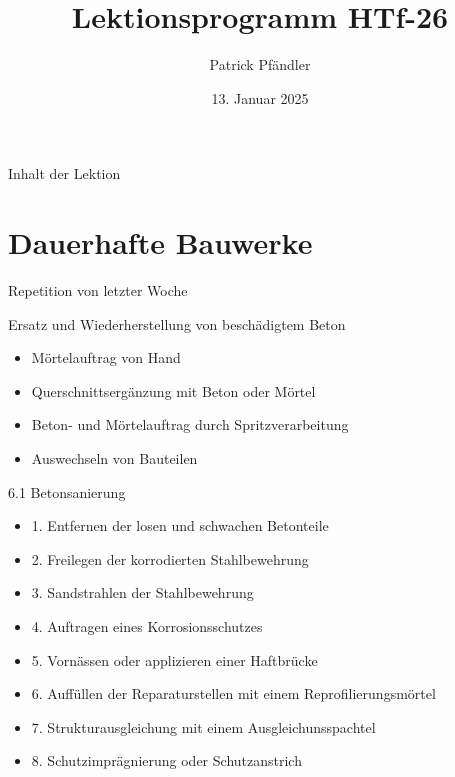 \def\customoptions{aspectratio=169} %

\title{\textbf{Lektionsprogramm HTf-26}}
\author{Patrick Pfändler}
\date{13. Januar 2025}




\frame{\titlepage}

\begin{frame}{Inhalt der Lektion}
    \tableofcontents
\end{frame}






\section{Dauerhafte Bauwerke}
\BlueSectionSlide


\begin{frame}{Repetition von letzter Woche}
    \begin{block}{Ersatz und Wiederherstellung von beschädigtem Beton}
        \begin{itemize}
            \item[3.1] Mörtelauftrag von Hand
            \item[3.2] Querschnittsergänzung mit Beton oder Mörtel
            \item[3.3] Beton- und Mörtelauftrag durch Spritzverarbeitung
            \item [3.4] Auswechseln von Bauteilen
        \end{itemize}

    \end{block}

\end{frame}

\begin{frame}{6.1 Betonsanierung}
    \begin{itemize}
        \item 1. Entfernen der losen und schwachen Betonteile
        \item 2. Freilegen der korrodierten Stahlbewehrung
        \item 3. Sandstrahlen der Stahlbewehrung
        \item 4. Auftragen eines Korrosionsschutzes 
        \item 5. Vornässen oder applizieren einer Haftbrücke
        \item 6. Auffüllen der Reparaturstellen mit einem Reprofilierungsmörtel
        \item 7. Strukturausgleichung mit einem Ausgleichunsspachtel
        \item 8. Schutzimprägnierung oder Schutzanstrich
    \end{itemize}
\end{frame}

